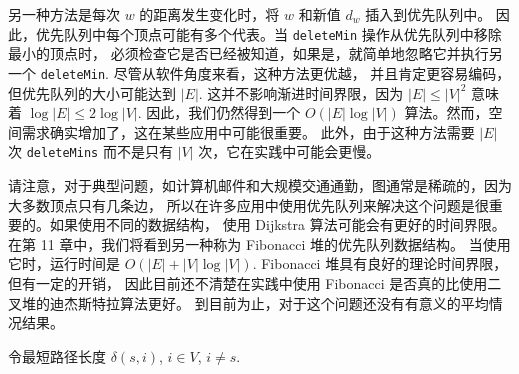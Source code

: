 \documentclass[a4paper]{ctexart}
\theoremstyle{definition}
\theoremstyle{definition}
\begin{document}
另一种方法是每次 \( w \) 的距离发生变化时，将 \( w \) 和新值 \( d_w \) 插入到优先队列中。
因此，优先队列中每个顶点可能有多个代表。当 \verb|deleteMin| 操作从优先队列中移除最小的顶点时，
必须检查它是否已经被知道，如果是，就简单地忽略它并执行另一个 \verb|deleteMin|. 尽管从软件角度来看，这种方法更优越，
并且肯定更容易编码，但优先队列的大小可能达到 \( |E| \). 这并不影响渐进时间界限，因为 \( |E| \leq |V|^2 \) 意味着 \( \log|E| \leq 2\log|V| \). 
因此，我们仍然得到一个 \( O(|E|\log|V|) \) 算法。然而，空间需求确实增加了，这在某些应用中可能很重要。
此外，由于这种方法需要 \( |E| \) 次 \verb|deleteMins| 而不是只有 \( |V| \) 次，它在实践中可能会更慢。

请注意，对于典型问题，如计算机邮件和大规模交通通勤，图通常是稀疏的，因为大多数顶点只有几条边，
所以在许多应用中使用优先队列来解决这个问题是很重要的。如果使用不同的数据结构，
使用 Dijkstra 算法可能会有更好的时间界限。在第 11 章中，我们将看到另一种称为 Fibonacci 堆的优先队列数据结构。
当使用它时，运行时间是 \( O(|E| + |V|\log|V|) \). Fibonacci 堆具有良好的理论时间界限，但有一定的开销，
因此目前还不清楚在实践中使用 Fibonacci 是否真的比使用二叉堆的迪杰斯特拉算法更好。
到目前为止，对于这个问题还没有有意义的平均情况结果。


令最短路径长度 $\delta(s, i)$,
$i \in V$, $i \neq s$.


\end{document}
